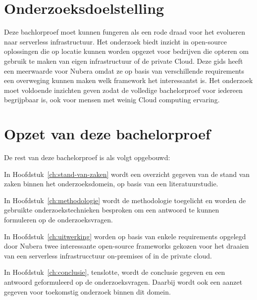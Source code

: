 \section{Onderzoeksdoelstelling}
\label{sec:onderzoeksdoelstelling}

Deze bachlorproef moet kunnen fungeren als een rode draad voor het evolueren naar serverless infrastructuur. Het onderzoek biedt inzicht in open-source oplossingen die op locatie kunnen worden opgezet voor bedrijven die opteren om gebruik te maken van eigen infrastructuur of de private Cloud. Deze gids heeft een meerwaarde voor Nubera omdat ze op basis van verschillende requirements een overweging kunnen maken welk framework het interessantst is. Het onderzoek moet voldoende inzichten geven zodat de volledige bachelorproef voor iedereen begrijpbaar is, ook voor mensen met weinig Cloud computing ervaring.


\section{Opzet van deze bachelorproef}
\label{sec:opzet-bachelorproef}


De rest van deze bachelorproef is als volgt opgebouwd:

In Hoofdstuk~\ref{ch:stand-van-zaken} wordt een overzicht gegeven van de stand van zaken binnen het onderzoeksdomein, op basis van een literatuurstudie.

In Hoofdstuk~\ref{ch:methodologie} wordt de methodologie toegelicht en worden de gebruikte onderzoekstechnieken besproken om een antwoord te kunnen formuleren op de onderzoeksvragen.

In Hoofdstuk~\ref{ch:uitwerking} worden op basis van enkele requirements opgelegd door Nubera twee interessante open-source frameworks gekozen voor het draaien van een serverless infrastrucctuur on-premises of in de private cloud.


In Hoofdstuk~\ref{ch:conclusie}, tenslotte, wordt de conclusie gegeven en een antwoord geformuleerd op de onderzoeksvragen. Daarbij wordt ook een aanzet gegeven voor toekomstig onderzoek binnen dit domein.

